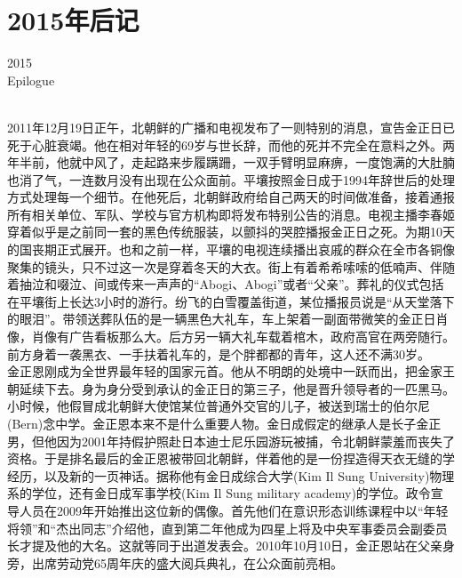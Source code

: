 \fancyhead[RO]{{\tiny{\textcolor{Gray}{\FA \ }}}\thepage}
\fancyhead[LE]{{\tiny{\textcolor{Gray}{\FA \ }}}\thepage}
\fancyfoot[LE,RO]{}
\fancyfoot[LO,CE]{}
\fancyfoot[CO,RE]{}
\chapter*{2015年后记}
\vspace{10mm}
\begin{flushright}
	\textcolor{PinYinColor}{\EN \huge{2015\\
	Epilogue\\
	\ \\}}
\end{flushright}
2011年12月19日正午，北朝鲜的广播和电视发布了一则特别的消息，宣告金正日已死于心脏衰竭。他在相对年轻的69岁与世长辞，而他的死并不完全在意料之外。两年半前，他就中风了，走起路来步履蹒跚，一双手臂明显麻痹，一度饱满的大肚腩也消了气，一连数月没有出现在公众面前。平壤按照金日成于1994年辞世后的处理方式处理每一个细节。在他死后，北朝鲜政府给自己两天的时间做准备，接着通报所有相关单位、军队、学校与官方机构即将发布特别公告的消息。电视主播李春姬穿着似乎是之前同一套的黑色传统服装，以颤抖的哭腔播报金正日之死。为期10天的国丧期正式展开。也和之前一样，平壤的电视连续播出哀戚的群众在全市各铜像聚集的镜头，只不过这一次是穿着冬天的大衣。街上有着希希嗦嗦的低喃声、伴随着抽泣和啜泣、间或传来一声声的“Abogi、Abogi”或者“父亲”。葬礼的仪式包括在平壤街上长达3小时的游行。纷飞的白雪覆盖街道，某位播报员说是“从天堂落下的眼泪”。带领送葬队伍的是一辆黑色大礼车，车上架着一副面带微笑的金正日肖像，肖像有广告看板那么大。后方另一辆大礼车载着棺木，政府高官在两旁随行。前方身着一袭黑衣、一手扶着礼车的，是个胖都都的青年，这人还不满30岁。\\

金正恩刚成为全世界最年轻的国家元首。他从不明朗的处境中一跃而出，把金家王朝延续下去。身为身分受到承认的金正日的第三子，他是晋升领导者的一匹黑马。小时候，他假冒成北朝鲜大使馆某位普通外交官的儿子，被送到瑞士的伯尔尼(Bern)念中学。金正恩本来不是什么重要人物。金日成假定的继承人是长子金正男，但他因为2001年持假护照赴日本迪士尼乐园游玩被捕，令北朝鲜蒙羞而丧失了资格。于是排名最后的金正恩被带回北朝鲜，伴着他的是一份捏造得天衣无缝的学经历，以及新的一页神话。据称他有金日成综合大学(Kim Il Sung University)物理系的学位，还有金日成军事学校(Kim Il Sung military academy)的学位。政令宣导人员在2009年开始推出这位新的偶像。首先他们在意识形态训练课程中以“年轻将领”和“杰出同志”介绍他，直到第二年他成为四星上将及中央军事委员会副委员长才提及他的大名。这就等同于出道发表会。2010年10月10日，金正恩站在父亲身旁，出席劳动党65周年庆的盛大阅兵典礼，在公众面前亮相。\\

